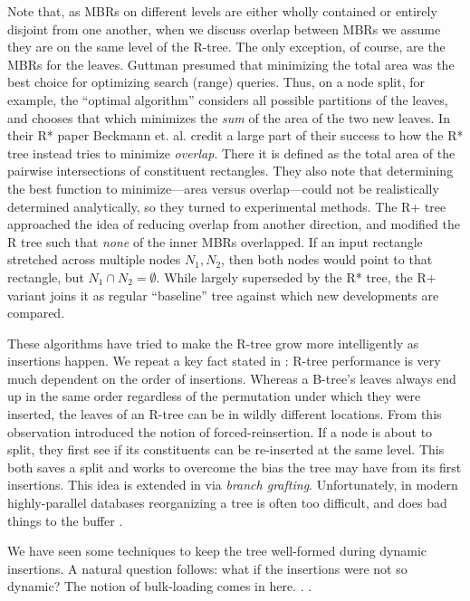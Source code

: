 Note that, as MBRs on different levels are either wholly contained or entirely disjoint from one another, when we discuss overlap between MBRs we assume they are on the same level of the R-tree.
The only exception, of course, are the MBRs for the leaves.
Guttman \cite{guttman84} presumed that minimizing the total area was the best choice for optimizing search (range) queries.
Thus, on a node split, for example, the ``optimal algorithm'' considers all possible partitions of the leaves, and chooses that which minimizes the \emph{sum} of the area of the two new leaves.
In their R* paper \cite{beckmannkriegelschneiderseeger90} Beckmann et. al. credit a large part of their success to how the R* tree instead tries to minimize \emph{overlap}.
There it is defined as the total area of the pairwise intersections of constituent rectangles.
They also note that determining the best function to minimize---area versus overlap---could not be realistically determined analytically, so they turned to experimental methods.
The R+ tree \cite{sellisroussopoulosfaloutsos87} approached the idea of reducing overlap from another direction, and modified the R tree such that \emph{none} of the inner MBRs overlapped.
If an input rectangle stretched across multiple nodes $N_1,N_2$, then both nodes would point to that rectangle, but $N_1\cap N_2=\emptyset$.
While largely superseded by the R* tree, the R+ variant joins it as regular ``baseline'' tree against which new developments are compared.

These algorithms have tried to make the R-tree grow more intelligently as insertions happen.
We repeat a key fact stated in \cite{beckmannkriegelschneiderseeger90}: R-tree performance is very much dependent on the order of insertions.
Whereas a B-tree's leaves always end up in the same order regardless of the permutation under which they were inserted, the leaves of an R-tree can be in wildly different locations.
From this observation \cite{beckmannkriegelschneiderseeger90} introduced the notion of forced-reinsertion.
If a node is about to split, they first see if its constituents can be re-inserted at the same level.
This both saves a split and works to overcome the bias the tree may have from its first insertions.
This idea is extended in \cite{schrekchen00} via \emph{branch grafting}.
Unfortunately, in modern highly-parallel databases reorganizing a tree is often too difficult, and does bad things to the buffer \cite{beckmannseeger09}.

We have seen some techniques to keep the tree well-formed during dynamic insertions.
A natural question follows: what if the insertions were not so dynamic?
The notion of bulk-loading comes in here.\cite{argehinrichsvahrenholdvitter99}
\cite{garcialopezleutenegger98}.
\cite{biveinissaltenisjensen07}.

